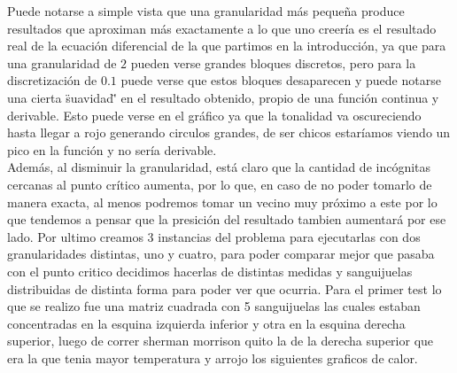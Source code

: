 Puede notarse a simple vista que una granularidad más pequeña produce resultados que aproximan más exactamente a lo que uno creería es el resultado real de la ecuación diferencial de la que partimos en la introducción, ya que para una granularidad de $2$ pueden verse grandes bloques discretos, pero para la discretización de $0.1$ puede verse que estos bloques desaparecen y puede notarse una cierta \"suavidad\"' en el resultado obtenido, propio de una función continua y derivable. Esto puede verse en el gráfico ya que la tonalidad va oscureciendo hasta llegar a rojo generando circulos grandes, de ser chicos estaríamos viendo un pico en la función y no sería derivable.
\\
Además, al disminuir la granularidad, está claro que la cantidad de incógnitas cercanas al punto crítico aumenta, por lo que, en caso de no poder tomarlo de manera exacta, al menos podremos tomar un vecino muy próximo a este por lo que tendemos a pensar que la presición del resultado tambien aumentará por ese lado.
Por ultimo creamos 3 instancias del problema para ejecutarlas con dos granularidades distintas, uno y cuatro, para poder comparar mejor que pasaba con el punto critico decidimos hacerlas de distintas medidas y sanguijuelas distribuidas de distinta forma para poder ver que ocurria.
Para el primer test lo que se realizo fue una matriz cuadrada con 5 sanguijuelas las cuales estaban concentradas en la esquina izquierda inferior y otra en la esquina derecha superior, luego de correr sherman morrison quito la de la derecha superior que era la que tenia mayor temperatura y arrojo los siguientes graficos de calor.

